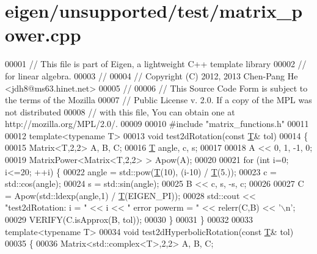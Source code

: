 \hypertarget{eigen_2unsupported_2test_2matrix__power_8cpp_source}{}\section{eigen/unsupported/test/matrix\+\_\+power.cpp}
\label{eigen_2unsupported_2test_2matrix__power_8cpp_source}

\begin{DoxyCode}
00001 \textcolor{comment}{// This file is part of Eigen, a lightweight C++ template library}
00002 \textcolor{comment}{// for linear algebra.}
00003 \textcolor{comment}{//}
00004 \textcolor{comment}{// Copyright (C) 2012, 2013 Chen-Pang He <jdh8@ms63.hinet.net>}
00005 \textcolor{comment}{//}
00006 \textcolor{comment}{// This Source Code Form is subject to the terms of the Mozilla}
00007 \textcolor{comment}{// Public License v. 2.0. If a copy of the MPL was not distributed}
00008 \textcolor{comment}{// with this file, You can obtain one at http://mozilla.org/MPL/2.0/.}
00009 
00010 \textcolor{preprocessor}{#include "matrix\_functions.h"}
00011 
00012 \textcolor{keyword}{template}<\textcolor{keyword}{typename} T>
00013 \textcolor{keywordtype}{void} test2dRotation(\textcolor{keyword}{const} \hyperlink{group___sparse_core___module_class_eigen_1_1_triplet}{T}& tol)
00014 \{
00015   Matrix<T,2,2> A, B, C;
00016   \hyperlink{group___sparse_core___module_class_eigen_1_1_triplet}{T} angle, c, s;
00017 
00018   A << 0, 1, -1, 0;
00019   MatrixPower<Matrix<T,2,2> > Apow(A);
00020 
00021   \textcolor{keywordflow}{for} (\textcolor{keywordtype}{int} i=0; i<=20; ++i) \{
00022     angle = std::pow(\hyperlink{group___sparse_core___module_class_eigen_1_1_triplet}{T}(10), (i-10) / \hyperlink{group___sparse_core___module_class_eigen_1_1_triplet}{T}(5.));
00023     c = std::cos(angle);
00024     s = std::sin(angle);
00025     B << c, s, -s, c;
00026 
00027     C = Apow(std::ldexp(angle,1) / \hyperlink{group___sparse_core___module_class_eigen_1_1_triplet}{T}(EIGEN\_PI));
00028     std::cout << \textcolor{stringliteral}{"test2dRotation: i = "} << i << \textcolor{stringliteral}{"   error powerm = "} << relerr(C,B) << \textcolor{charliteral}{'\(\backslash\)n'};
00029     VERIFY(C.isApprox(B, tol));
00030   \}
00031 \}
00032 
00033 \textcolor{keyword}{template}<\textcolor{keyword}{typename} T>
00034 \textcolor{keywordtype}{void} test2dHyperbolicRotation(\textcolor{keyword}{const} \hyperlink{group___sparse_core___module_class_eigen_1_1_triplet}{T}& tol)
00035 \{
00036   Matrix<std::complex<T>,2,2> A, B, C;

\end{DoxyCode}
